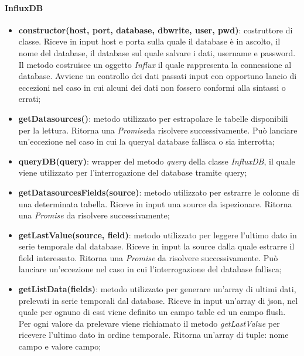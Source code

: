 \paragraph{InfluxDB}

\begin{itemize}

	\item \textbf{constructor(host, port, database, dbwrite, user, pwd)}: costruttore di classe. Riceve in 
	input host e porta sulla quale il database è in ascolto, il nome del database, il database sul quale salvare i 
	dati, username e password. Il metodo costruisce un oggetto \textit{Influx} il quale rappresenta la 
	connessione al database. Avviene un controllo dei dati passati input con opportuno lancio di eccezioni 
	nel caso in cui alcuni dei dati non fossero conformi alla sintassi o errati; 
	
	\item \textbf{getDatasources()}: metodo utilizzato per estrapolare le tabelle disponibili per la lettura.
	Ritorna una \textit{Promise}\glossario da risolvere successivamente. Può lanciare un'eccezione nel caso in cui 
	la query\glossario al database fallisca o sia interrotta; 
	
	\item \textbf{queryDB(query)}: wrapper del metodo \textit{query} della classe \textit{InfluxDB}, il quale
	viene utilizzato per l'interrogazione del database tramite query; 
	
	\item \textbf{getDatasourcesFields(source)}: metodo utilizzato per estrarre le colonne di una determinata 
	tabella. Riceve in input una source da ispezionare. Ritorna una \textit{Promise} da risolvere
	successivamente; 
	
	\item \textbf{getLastValue(source, field)}: metodo utilizzato per leggere l'ultimo dato in serie temporale 
	dal database. Riceve in input la source dalla quale estrarre il field interessato. Ritorna una 
	\textit{Promise}
	da risolvere successivamente. Può lanciare un'eccezione nel caso in cui l'interrogazione del database 
	fallisca; 
	
	\item \textbf{getListData(fields)}: metodo utilizzato per generare un'array di ultimi dati, prelevati 
	in serie temporali dal database. Riceve in input un'array di json, nel quale per ognuno di essi viene 
	definito un campo table ed un campo flush. Per ogni valore da prelevare viene richiamato il metodo 
	\textit{getLastValue} per ricevere l'ultimo dato in ordine temporale. 
	Ritorna un'array di tuple: nome campo  e valore campo; 
	

\end{itemize}
